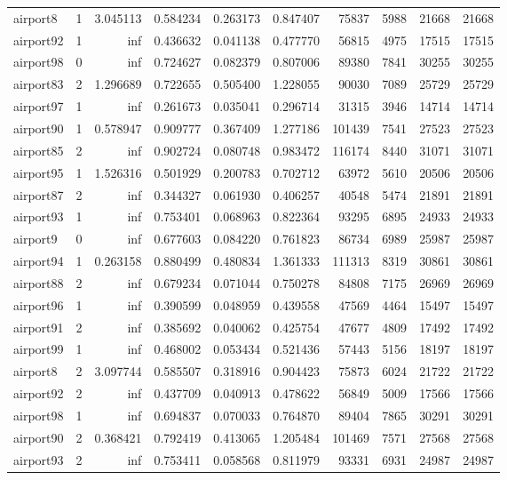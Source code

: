 \begin{longtable}{|l|r|r|r|r|r|r|r|r|r|}
airport8 & 1 & 3.045113 & 0.584234 & 0.263173 & 0.847407 & 75837 & 5988 & 21668 & 21668 \\
airport92 & 1 & inf & 0.436632 & 0.041138 & 0.477770 & 56815 & 4975 & 17515 & 17515 \\
airport98 & 0 & inf & 0.724627 & 0.082379 & 0.807006 & 89380 & 7841 & 30255 & 30255 \\
airport83 & 2 & 1.296689 & 0.722655 & 0.505400 & 1.228055 & 90030 & 7089 & 25729 & 25729 \\
airport97 & 1 & inf & 0.261673 & 0.035041 & 0.296714 & 31315 & 3946 & 14714 & 14714 \\
airport90 & 1 & 0.578947 & 0.909777 & 0.367409 & 1.277186 & 101439 & 7541 & 27523 & 27523 \\
airport85 & 2 & inf & 0.902724 & 0.080748 & 0.983472 & 116174 & 8440 & 31071 & 31071 \\
airport95 & 1 & 1.526316 & 0.501929 & 0.200783 & 0.702712 & 63972 & 5610 & 20506 & 20506 \\
airport87 & 2 & inf & 0.344327 & 0.061930 & 0.406257 & 40548 & 5474 & 21891 & 21891 \\
airport93 & 1 & inf & 0.753401 & 0.068963 & 0.822364 & 93295 & 6895 & 24933 & 24933 \\
airport9 & 0 & inf & 0.677603 & 0.084220 & 0.761823 & 86734 & 6989 & 25987 & 25987 \\
airport94 & 1 & 0.263158 & 0.880499 & 0.480834 & 1.361333 & 111313 & 8319 & 30861 & 30861 \\
airport88 & 2 & inf & 0.679234 & 0.071044 & 0.750278 & 84808 & 7175 & 26969 & 26969 \\
airport96 & 1 & inf & 0.390599 & 0.048959 & 0.439558 & 47569 & 4464 & 15497 & 15497 \\
airport91 & 2 & inf & 0.385692 & 0.040062 & 0.425754 & 47677 & 4809 & 17492 & 17492 \\
airport99 & 1 & inf & 0.468002 & 0.053434 & 0.521436 & 57443 & 5156 & 18197 & 18197 \\
airport8 & 2 & 3.097744 & 0.585507 & 0.318916 & 0.904423 & 75873 & 6024 & 21722 & 21722 \\
airport92 & 2 & inf & 0.437709 & 0.040913 & 0.478622 & 56849 & 5009 & 17566 & 17566 \\
airport98 & 1 & inf & 0.694837 & 0.070033 & 0.764870 & 89404 & 7865 & 30291 & 30291 \\
airport90 & 2 & 0.368421 & 0.792419 & 0.413065 & 1.205484 & 101469 & 7571 & 27568 & 27568 \\
airport93 & 2 & inf & 0.753411 & 0.058568 & 0.811979 & 93331 & 6931 & 24987 & 24987 \\

\end{longtable}
